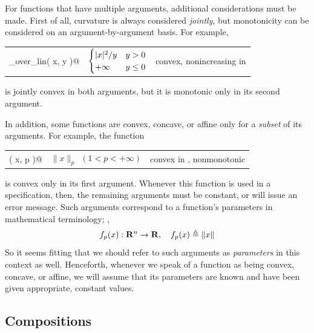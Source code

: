 \documentclass[12pt]{article}
\begin{document}
For functions that have multiple arguments, additional considerations must
be made. First of all, curvature is always considered \emph{jointly}, but monotonicity
can be considered on an argument-by-argument basis. For example,
\begin{center}
\begin{tabular}{lll}
	\verb@quad_over_lin( x, y )@ & $\begin{cases} |x|^2/y&y> 0\\+\infty&y\leq 0 \end{cases}$ & convex, nonincreasing in \verb@y@
\end{tabular}
\end{center}
is jointly convex in both arguments, but it is monotonic 
only in its second argument.

In addition, some functions are convex, concave, or affine only for 
a \emph{subset} of its arguments. For example, the function
\begin{center}
\begin{tabular}{lll}
	\verb@norm( x, p )@ & $\|x\|_p~~(1<p<+\infty)$ & convex in \verb@x@, nonmonotonic
\end{tabular}
\end{center}
is convex only in its first argument. Whenever this function is used
in a \cvx specification, then, the remaining
arguments must be constant, or \cvx will issue an error message. Such arguments
correspond to a function's parameters in mathematical terminology; \eg,
\begin{equation*}
	f_p(x):\R^n\rightarrow\R, \quad f_p(x) \triangleq \|x\|
\end{equation*}
So it seems fitting that we should refer to such arguments as \emph{parameters}
in this context as well. Henceforth, whenever we speak of a \cvx function
as being convex, concave, or affine, we will assume that its parameters are
known and have been given appropriate, constant values.

\subsection{Compositions}
\label{sec:compositions}
\end{document}
